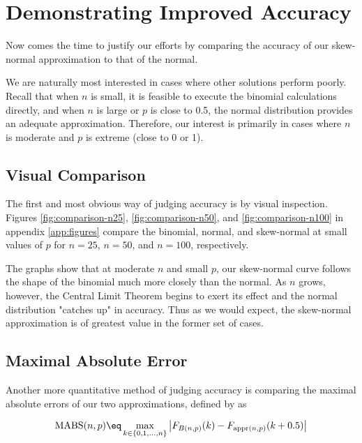 \section{Demonstrating Improved Accuracy}
\label{sec:accuracy}

Now comes the time to justify our efforts by comparing the accuracy of our
skew-normal approximation to that of the normal.

We are naturally most interested in cases where other solutions perform poorly.
Recall that when $n$ is small, it is feasible to execute the binomial
calculations directly, and when $n$ is large or $p$ is close to 0.5, the normal
distribution provides an adequate approximation. Therefore, our interest is
primarily in cases where $n$ is moderate and $p$ is extreme (close to 0 or
1).\footnotemark


\subsection{Visual Comparison}

The first and most obvious way of judging accuracy is by visual inspection.
Figures \ref{fig:comparison-n25}, \ref{fig:comparison-n50}, and
\ref{fig:comparison-n100} in appendix \ref{app:figures} compare the binomial,
normal, and skew-normal at small values of $p$ for $n=25$, $n=50$, and $n=100$,
respectively.

The graphs show that at moderate $n$ and small $p$, our skew-normal curve
follows the shape of the binomial much more closely than the normal. As $n$
grows, however, the Central Limit Theorem begins to exert its effect and the
normal distribution "catches up" in accuracy. Thus as we would expect, the
skew-normal approximation is of greatest value in the former set of cases.

\subsection{Maximal Absolute Error}
\label{subsec:mabs}

Another more quantitative method of judging accuracy is comparing the maximal
absolute errors of our two approximations, defined by \citet{mabs} as

\begin{equation}
  \textnormal{MABS}(n, p) \eq \max_{k \in \{0, 1,...,n\}} \left| F_{B(n,p)} (k) -  F_{\textnormal{appr}(n,p)}(k + 0.5) \right|
\end{equation}

